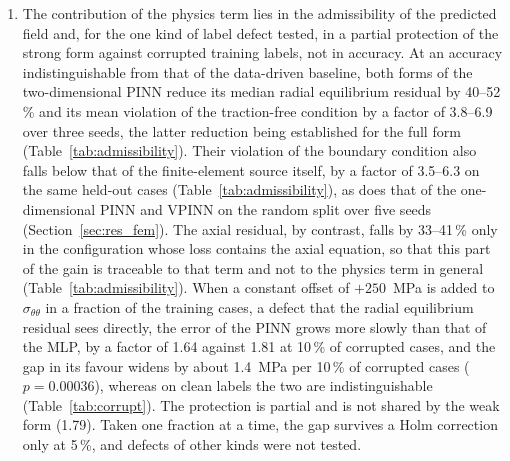 \documentclass[subscriptcorrection,upint,varvw,barcolor=Goldenrod3,mathalfa=cal=euler,balance,hyphenate,french,pdf-a]{asmejour} %
\begin{document}
\begin{enumerate}
\item The contribution of the physics term lies in the admissibility of the predicted field and, for the one kind of label defect tested, in a partial protection of the strong form against corrupted training labels, not in accuracy. At an accuracy indistinguishable from that of the data-driven baseline, both forms of the two-dimensional PINN reduce its median radial equilibrium residual by 40--52\,\% and its mean violation of the traction-free condition by a factor of 3.8--6.9 over three seeds, the latter reduction being established for the full form (Table~\ref{tab:admissibility}). Their violation of the boundary condition also falls below that of the finite-element source itself, by a factor of 3.5--6.3 on the same held-out cases (Table~\ref{tab:admissibility}), as does that of the one-dimensional PINN and VPINN on the random split over five seeds (Section~\ref{sec:res_fem}). The axial residual, by contrast, falls by 33--41\,\% only in the configuration whose loss contains the axial equation, so that this part of the gain is traceable to that term and not to the physics term in general (Table~\ref{tab:admissibility}). When a constant offset of $+250$~MPa is added to $\sigma_{\theta\theta}$ in a fraction of the training cases, a defect that the radial equilibrium residual sees directly, the error of the PINN grows more slowly than that of the MLP, by a factor of 1.64 against 1.81 at 10\,\% of corrupted cases, and the gap in its favour widens by about 1.4~MPa per 10\,\% of corrupted cases ($p=0.00036$), whereas on clean labels the two are indistinguishable (Table~\ref{tab:corrupt}). The protection is partial and is not shared by the weak form (1.79). Taken one fraction at a time, the gap survives a Holm correction only at 5\,\%, and defects of other kinds were not tested. %


\end{enumerate}
\end{document}
